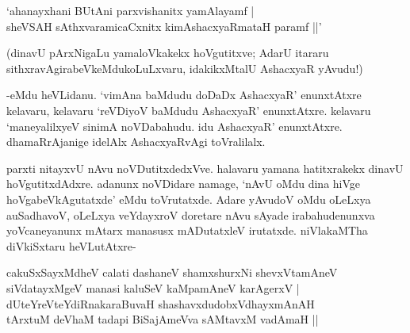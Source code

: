 \begin{shloka}
`ahanayxhani BUtAni parxvishanitx yamAlayamf |\\
sheVSAH sAthxvaramicaCxnitx kimAshacxyaRmataH paramf ||'
\end{shloka}

(dinavU pArxNigaLu yamaloVkakekx hoVgutitxve; AdarU itararu sithxravAgirabeVkeMdukoLuLxvaru, idakikxMtalU AshacxyaR yAvudu!)

-eMdu heVLidanu. `vimAna baMdudu doDaDx AshacxyaR' enunxtAtxre kelavaru, kelavaru `reVDiyoV baMdudu AshacxyaR' enunxtAtxre. kelavaru `maneyalilxyeV sinimA noVDabahudu. idu AshacxyaR' enunxtAtxre. dhamaRrAjanige idelAlx AshacxyaRvAgi toVralilalx.

parxti nitayxvU nAvu noVDutitxdedxVve. halavaru yamana hatitxrakekx dinavU hoVgutitxdAdxre. adanunx noVDidare namage, `nAvU oMdu dina hiVge hoVgabeVkAgutatxde' eMdu toVrutatxde. Adare yAvudoV oMdu oLeLxya auSadhavoV, oLeLxya veYdayxroV doretare nAvu sAyade irabahudenunxva yoVcaneyanunx mAtarx manasusx mADutatxleV irutatxde. niVlakaMTha diVkiSxtaru heVLutAtxre-

\begin{shloka}
cakuSxSayxMdheV calati dashaneV shamxshurxNi shevxVtamAneV\\
siVdatayxMgeV manasi kaluSeV kaMpamAneV karAgerxV |\\
dUteYreVteYdiRnakaraBuvaH shashavxdudobxVdhayxmAnAH\\
tArxtuM deVhaM tadapi BiSajAmeVva sAMtavxM vadAmaH ||
\end{shloka}

